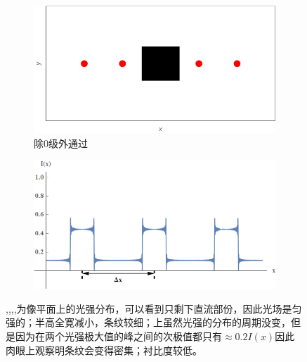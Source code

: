 \documentclass[a4paper]{article}
\begin{document}
\begin{figure}[H]
\begin{subfigure}[t]{0.4\textwidth}
        \caption{}
        \label{fig3-3-8}
    \end{subfigure}
    \begin{subfigure}[t]{0.4\textwidth}
        \centering
        \includegraphics[width=\textwidth]{simu/E.png}
        \caption{除$0$级外通过}
        \label{fig3-3-9}
    \end{subfigure}
    \begin{subfigure}[t]{0.4\textwidth}
        \centering
        \includegraphics[width=\textwidth]{simu/Eimg.png}
        \caption{}
        \label{fig3-3-10}
    \end{subfigure}
    \captionsetup{justification=centering,subrefformat=parens,margin=2cm,format=cont}
    \caption{,,,,为像平面上的光强分布，可以看到只剩下直流部份，因此光场是匀强的；半高全寛减小，条纹较细；上虽然光强的分布的周期没变，但是因为在两个光强极大值的峰之间的次极值都只有$\approx 0.2I(x)$因此肉眼上观察明条纹会变得密集；衬比度较低。}
\end{figure}
\end{document}
